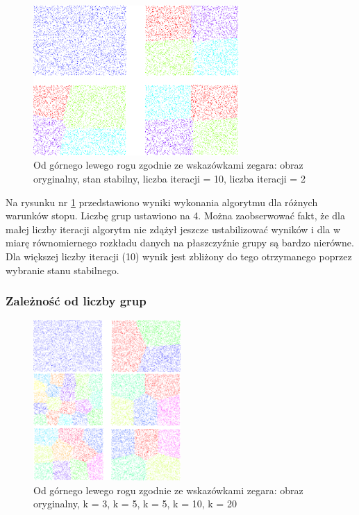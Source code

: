 \begin{figure}[!h]
	\centering
	\includegraphics[width=0.7\textwidth]{./img/condition.png}
	\caption{Od górnego lewego rogu zgodnie ze wskazówkami zegara: obraz oryginalny, stan stabilny, liczba iteracji = 10, liczba iteracji = 2}
	\label{img:cond}
\end{figure}

Na rysunku nr \ref{img:cond} przedstawiono wyniki wykonania algorytmu dla różnych warunków stopu. Liczbę grup ustawiono na 4. Można zaobserwować fakt, że dla małej liczby iteracji algorytm nie zdążył jeszcze ustabilizować wyników i dla w miarę równomiernego rozkładu danych na płaszczyźnie grupy są bardzo nierówne. Dla większej liczby iteracji (10) wynik jest zbliżony do tego otrzymanego poprzez wybranie stanu stabilnego.

\subsubsection{Zależność od liczby grup}

\begin{figure}[!h]
	\centering
	\includegraphics[width=0.5\textwidth]{./img/number.png}
	\caption{Od górnego lewego rogu zgodnie ze wskazówkami zegara: obraz oryginalny, k = 3, k = 5, k = 5, k = 10, k = 20}
	\label{img:number}
\end{figure}

